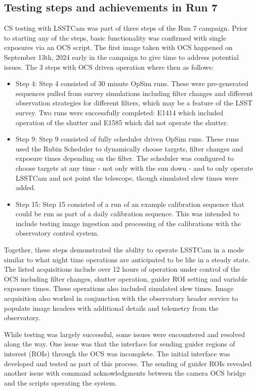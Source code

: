 \subsection{Testing steps and achievements in Run 7}
CS testing with LSSTCam was part of three steps of the Run 7 campaign. Prior to starting any of the steps, basic functionality was confirmed with single exposures via an OCS script. The first image taken with OCS happened on September 13th, 2024 early in the campaign to give time to address potential issues. The 3 steps with OCS driven operation where then as follows:
\begin{itemize}
    \item Step 4: Step 4 consisted of 30 minute OpSim runs. These were pre-generated sequences pulled from survey simulations including filter changes and different observation strategies for different filters, which may be a feature of the LSST survey. Two runs were successfully completed: E1414 which included operation of the shutter and E1585 which did not operate the shutter.
    \item Step 9: Step 9 consisted of fully scheduler driven OpSim runs. These runs used the Rubin Scheduler to dynamically choose targets, filter changes and exposure times depending on the filter. The scheduler was configured to choose targets at any time - not only with the sun down - and to only operate LSSTCam and not point the telescope, though simulated slew times were added. 
    \item Step 15: Step 15 consisted of a run of an example calibration sequence that could be run as part of a daily calibration sequence. This was intended to include testing image ingestion and processing of the calibrations with the observatory control system.
\end{itemize}

Together, these steps demonstrated the ability to operate LSSTCam in a mode similar to what night time operations are anticipated to be like in a steady state. The listed acquisitions include over 12 hours of operation under control of the OCS including filter changes, shutter operation, guider ROI setting and variable exposure times. These operations also included simulated slew times. Image acquisition also worked in conjunction with the observatory header service to populate image headers with additional details and telemetry from the observatory.

While testing was largely successful, some issues were encountered and resolved along the way. One issue was that the interface for sending guider regions of interest (ROIs) through the OCS was incomplete. The initial interface was developed and tested as part of this process. The sending of guider ROIs revealed another issue with command acknowledgments between the camera OCS bridge and the scripts operating the system.  


